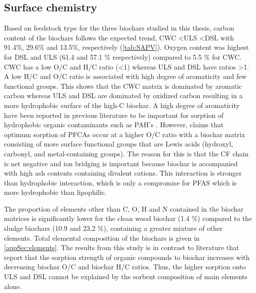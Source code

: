 \subsection{Surface chemistry}
Based on feedstock type for the three biochars studied in this thesis, carbon content of the biochars follows the expected trend, CWC \textless ULS \textless DSL with 91.4\%, 29.6\% and 13.5\%, respectively (\cref{tab:SAPV}). Oxygen content was highest for DSL and ULS (61.4 and 57.1 \% respectively) compared to 5.5 \% for CWC. CWC has a low O/C and H/C ratio (\textless 1) whereas ULS and DSL have ratios \textgreater 1. A low H/C and O/C ratio is associated with high degree of aromaticity and few functional groups. This shows that the CWC matrix is dominated by aromatic carbon whereas ULS and DSL are dominated by oxidized carbon resulting in a more hydrophobic surface of the high-C biochar. A high degree of aromaticity have been reported in previous literature to be important for sorption of hydrophobic organic contaminants such as PAH's \citep{Cornelissen2005}. However, \cite{du2014adsorption} claims that optimum sorption of PFCAs occur at a higher O/C ratio with a biochar matrix consisting of more surface functional groups that are Lewis acids (hydroxyl, carbonyl, and metal-containing groups). The reason for this is that the CF chain is net negative and ion bridging is important because biochar is accompanied with high ash contents containing divalent cations. This interaction is stronger than hydrophobic interaction, which is only a compromise for PFAS which is more hydrophobic than lipophilic. 

The proportion of elements other than C, O, H and N contained in the biochar matrices is significantly lower for the clean wood biochar (1.4 \%) compared to the sludge biochars (10.9 and 23.2 \%), containing a greater mixture of other elements. Total elemental composition of the biochars is given in \cref{appSec:elements}. The results from this study is in contrast to literature \citep{Hale2016,Sormo2021,zhang2021sorption} that report that the sorption strength of organic compounds to biochar increases with decreasing biochar O/C and biochar H/C ratios. Thus, the higher sorption onto ULS and DSL cannot be explained by the sorbent composition of main elements alone.

